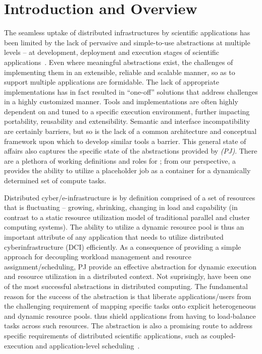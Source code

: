 \documentclass[conference]{IEEEtran}
\begin{document}
\section{Introduction and Overview} 
The seamless uptake of distributed infrastructures by scientific
applications has been limited by the lack of pervasive and
simple-to-use abstractions at multiple levels -- at development,
deployment and execution stages of scientific
applications~\cite{dpagrid2009}.  Even where meaningful abstractions
exist, the challenges of implementing them in an extensible, reliable
and scalable manner, so as to support multiple applications are
formidable.  The lack of appropriate implementations has in fact
resulted in ``one-off'' solutions that address challenges in a highly
customized manner.  Tools and implementations are often highly
dependent on and tuned to a specific execution environment, further
impacting portability, reusability and extensibility.  Semantic and
interface incompatibility are certainly barriers, but so is the lack
of a common architecture and conceptual framework upon which to
develop similar tools a barrier.  This general state of affairs also
captures the specific state of the abstractions provided by {\it
  \pilotjobs (PJ)}.  There are a plethora of working definitions and
roles for \pilotjobs; from our perspective, a \pilotjob provides the
ability to utilize a placeholder job as a container for a dynamically
determined set of compute tasks.


Distributed cyber/e-infrastructure is by definition comprised of a set
of resources that is fluctuating -- growing, shrinking, changing in
load and capability (in contrast to a static resource utilization
model of traditional parallel and cluster computing systems).  The
ability to utilize a dynamic resource pool is thus an important
attribute of any application that needs to utilize distributed
cyberinfrastructure (DCI) efficiently. As a consequence of providing a
simple approach for decoupling workload management and resource
assignment/scheduling, PJ provide an effective abstraction for dynamic
execution and resource utilization in a distributed context.  Not
suprisingly, \pilotjobs have been one of the most successful
abstractions in distributed computing.  The fundamental reason for the
success of the \pilotjob abstraction is that \pilotjobs liberate
applications/users from the challenging requirement of mapping
specific tasks onto explicit heterogeneous and dynamic resource pools.
\pilotjobs thus shield applications from having to load-balance tasks
across such resources.  The \pilotjob abstraction is also a promising
route to address specific requirements of distributed scientific
applications, such as coupled-execution and application-level
scheduling~\cite{ko-efficient,DBLP:conf/hpdc/KimHMAJ10}.
\end{document}
